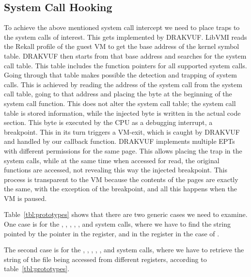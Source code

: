 \begin{table}[ht]
\begin{tabular}{ccccccc}
	\bottomrule
\end{tabular}
\end{table}

\subsection{System Call Hooking}\label{sub:hooking}

To achieve the above mentioned system call intercept we need to place traps to the system calls of interest. This gets implemented by DRAKVUF. LibVMI reads the Rekall profile of the guest \ac{VM} to get the base address of the kernel symbol table. DRAKVUF then starts from that base address and searches for the system call table. This table includes the function pointers for all supported system calls. Going through that table makes possible the detection and trapping of system calls.  This is achieved by reading the address of the system call from the system call table, going to that address and placing the  byte at the beginning of the system call function. This does not alter the system call table; the system call table is stored information, while the injected byte is written in the actual code section. This byte is executed by the \ac{CPU} as a debugging interrupt, a breakpoint. This in its turn triggers a VM-exit, which is caught by DRAKVUF and handled by our callback function. DRAKVUF implements multiple \ac{EPT}s with different permissions for the same page. This allows placing the trap in the system calls, while at the same time when accessed for read, the original functions are accessed, not revealing this way the injected breakpoint. This process is transparent to the \ac{VM} because the contents of the pages are exactly the same, with the exception of the breakpoint, and all this happens when the \ac{VM} is paused.

\par Table~\ref{tbl:prototypes} shows that there are two generic cases we need to examine. One case is for the , , , , , and  system calls, where we have to find the string pointed by the pointer in the  register, and in the  register in the case of . 

\par The second case is for the , , , , , and  system calls, where we have to retrieve the string of the file being accessed from different registers, according to table~\ref{tbl:prototypes}. 

